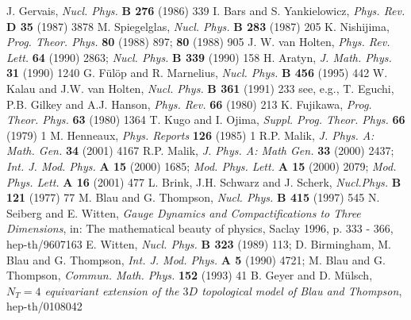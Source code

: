 \documentclass[a4paper,11pt]{article}
\begin{document}
\begin{thebibliography}{99}
\small{
 J. Gervais,
            {\it Nucl. Phys.} {\bf B 276} (1986) 339
 I. Bars and S. Yankielowicz,
            {\it Phys. Rev.} {\bf D 35} (1987) 3878 
 M. Spiegelglas,
            {\it Nucl. Phys.} {\bf B 283} (1987) 205
 K. Nishijima,
            {\it Prog. Theor. Phys.} {\bf 80} (1988) 897; 
            {\bf 80} (1988) 905
 J. W. van Holten, 
            {\it Phys. Rev. Lett.} {\bf 64} (1990) 2863;
            {\it Nucl. Phys.} {\bf B 339} (1990) 158   
 H. Aratyn,
            {\it J. Math. Phys.} {\bf 31} (1990) 1240
 G. F\"ul\"op and R. Marnelius,
            {\it Nucl. Phys.} {\bf B 456} (1995) 442
 W. Kalau and J.W. van Holten,
            {\it Nucl. Phys.} {\bf B 361} (1991) 233        
 see, e.g., T. Eguchi, P.B. Gilkey and A.J. Hanson,
            {\it Phys. Rev.} {\bf 66} (1980) 213
 K. Fujikawa,
             {\it Prog. Theor. Phys.} {\bf 63} (1980) 1364
 T. Kugo and I. Ojima,
             {\it Suppl. Prog. Theor. Phys.} {\bf 66} (1979) 1 
 M. Henneaux,
             {\it Phys. Reports} {\bf 126} (1985) 1
 R.P. Malik,
             {\it J. Phys. A: Math. Gen.} {\bf 34} (2001) 4167
 R.P. Malik,
             {\it J. Phys. A: Math Gen.} {\bf 33} (2000) 2437;
             {\it Int. J. Mod. Phys.} {\bf A 15} (2000) 1685;
             {\it Mod. Phys. Lett.} {\bf A 15} (2000) 2079; 
             {\it Mod. Phys. Lett.} {\bf A 16} (2001) 477
 L. Brink, J.H. Schwarz and J. Scherk,
             {\it Nucl.Phys.} {\bf B 121} (1977) 77
 M. Blau and G. Thompson, 
             {\it Nucl. Phys.} {\bf B 415} (1997) 545
 N. Seiberg and E. Witten,
             {\it Gauge Dynamics and Compactifications to Three Dimensions},
             in: {\sf The mathematical beauty of physics}, Saclay 1996, 
	     p. 333 - 366, hep-th/9607163
 E. Witten,
             {\it Nucl. Phys.} {\bf B 323} (1989) 113;
             D. Birmingham, M. Blau and G. Thompson,
             {\it Int. J. Mod. Phys.} {\bf A 5} (1990) 4721;
             M. Blau and G. Thompson,
             {\it Commun. Math. Phys.} {\bf 152} (1993) 41                 
 B. Geyer and D. M\"ulsch, 
             {\it $N_T = 4$ equivariant extension of the $3D$ topological
             model of Blau and Thompson}, hep-th/0108042
}
\end{thebibliography} 
\end{document}
